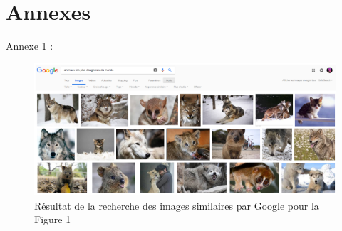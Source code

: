 \documentclass[a4paper,12pt]{article}
\begin{document}
\section{Annexes}
Annexe 1 : 
\begin{figure}[!ht]
    \centering
    \includegraphics[scale=0.8]{images/Res2GI.PNG}
    \caption{Résultat de la recherche des images similaires par Google pour la Figure 1}
\end{figure}
\end{document}

